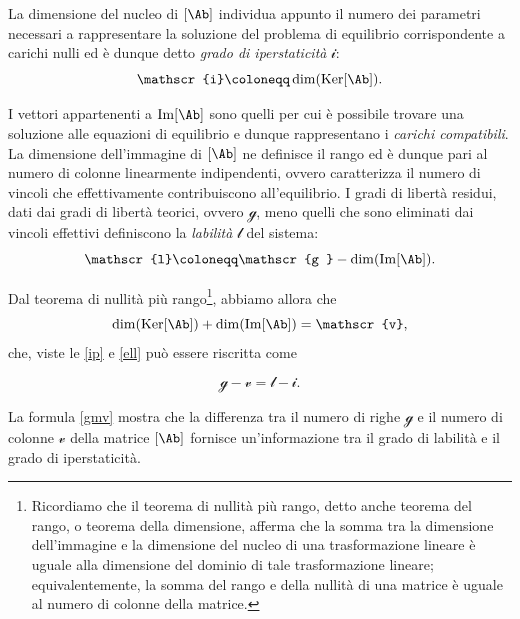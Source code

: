 La dimensione del nucleo di $[\Ab]$ individua appunto il numero dei parametri necessari a rappresentare la soluzione del problema di equilibrio corrispondente a carichi nulli ed è dunque detto \textit{grado di iperstaticità} $\mathscr{i}$:
\begin{equation}\label{ip}
\mathscr{i}\coloneqq \operatorname{dim}(\operatorname{Ker}[\Ab]).
\end{equation}


I  vettori appartenenti a $\operatorname{Im}[\Ab]$ sono quelli per cui è possibile trovare una soluzione alle equazioni di equilibrio e dunque rappresentano i \textit{carichi compatibili}. La dimensione dell'immagine di $[\Ab]$ ne definisce il rango ed è dunque pari al numero di colonne linearmente indipendenti, ovvero caratterizza il numero di vincoli che effettivamente contribuiscono all'equilibrio.  I gradi di libertà residui, dati dai gradi di libertà teorici, ovvero $\mathscr{g}$, meno quelli che sono eliminati dai vincoli effettivi definiscono la \textit{labilità} $\mathscr{l}$ del sistema:
\begin{equation}\label{ell}
\mathscr{l}\coloneqq \mathscr{g }-\operatorname{dim}(\operatorname{Im}[\Ab]).
\end{equation}




 Dal teorema di nullità più rango\footnote{Ricordiamo che il teorema di nullità più rango, detto anche teorema del rango, o teorema della dimensione, afferma che la somma tra la dimensione dell'immagine e la dimensione del nucleo di una trasformazione lineare è uguale alla dimensione del dominio di tale trasformazione lineare; equivalentemente, la somma del rango e della nullità di una matrice è uguale al numero di colonne della matrice.}, abbiamo allora che 
\begin{equation}
\operatorname{dim}(\operatorname{Ker}[\Ab])+\operatorname{dim}(\operatorname{Im}[\Ab])=\mathscr{v},
\end{equation}
che, viste le  \eqref{ip} e \eqref{ell} può essere riscritta come
\begin{definition}
	\begin{equation}\label{gmv}
\mathscr{g}-\mathscr{v}=\mathscr{l}-\mathscr{i}.
\end{equation}
\end{definition}

La formula \eqref{gmv} mostra che la differenza tra il numero di righe $\mathscr{g}$ e il numero di colonne $\mathscr{v}$ della matrice $[\Ab]$ fornisce un'informazione tra il grado di labilità e il grado di iperstaticità. 

